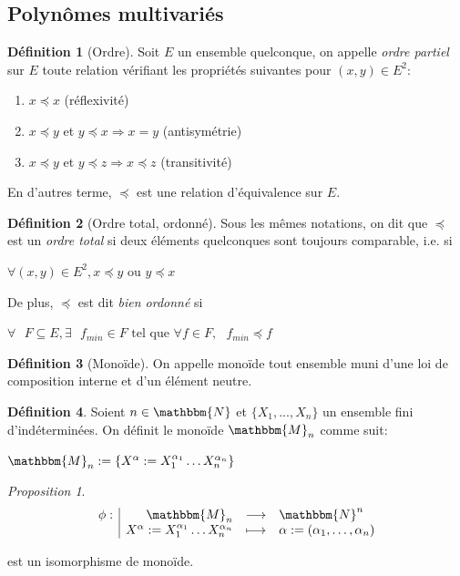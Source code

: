 \documentclass[12pt]{article}
\newcommand{\fonction}[5]{
\begin{displaymath}
\begin{array}{l|rcl}
\displaystyle
#1 : & #2 & \longrightarrow & #3 \\
    & #4 & \longmapsto & #5
\end{array}
\end{displaymath}
}
\theoremstyle{remark}\newtheorem{note}{Note}
\theoremstyle{remark}\newtheorem{nota}{Notation}
\newcommand{\M}{\mathbbm{M}}
\newcommand{\N}{\mathbbm{N}}
\newcommand{\ord}{\preccurlyeq}
\newtheorem{prop}{Proposition}
\theoremstyle{definition}
\newtheorem{definition}{Définition}
\begin{document}
\subsection{Polynômes multivariés}




\begin{definition}[Ordre]
Soit $E$ un ensemble quelconque, on appelle \textit{ordre partiel} sur $E$ toute relation vérifiant les propriétés suivantes pour $(x,y) \in E^2$:
	 \begin{enumerate}
	 	\item $x\ord x$ (réflexivité)
	 	\item $x\ord y$ et $y\ord x \Rightarrow x=y$ (antisymétrie)
	 	\item $x\ord y$ et $y\ord z \Rightarrow x\ord z$ (transitivité)
	 \end{enumerate}
En d'autres terme, $\ord$ est une relation d'équivalence sur $E$.
\end{definition}

\begin{definition}[Ordre total, ordonné]
Sous les mêmes notations, on dit que $\ord$ est un \textit{ordre total} si deux éléments quelconques sont toujours comparable, i.e. si
	\begin{center}$\forall (x,y)\in E^2, x\ord y\text{ ou } y\ord x$\end{center}
De plus, $\ord$ est dit \textit{bien ordonné} si
	\begin{center}$  \forall\text{ } F \subseteq E, \exists \text{ } f_{min}\in F \text{ tel que } \forall f\in F, \text{ } f_{min}\ord f $\end{center}
\end{definition}

\begin{definition}[Monoïde]
On appelle monoïde tout ensemble muni d'une loi de composition interne et d'un élément neutre.
\end{definition}

\begin{definition}
Soient $n\in\N$ et $\{X_1, ..., X_n\}$ un ensemble fini d'indéterminées. On définit le monoïde $\M_n$ comme suit:
	\begin{center} $\M_n := \{ X^{\alpha} := X_1^{\alpha_1}\ldots X_n^{\alpha_n}\}$ \end{center}
\end{definition}

\begin{prop}
\fonction{\phi}{\M_n}{\N^n}{ X^{\alpha} := X_1^{\alpha_1}\ldots X_n^{\alpha_n}}{\alpha:=(\alpha_1,\ldots, \alpha_n)}
est un isomorphisme de monoïde.
\end{prop}
\end{document}
